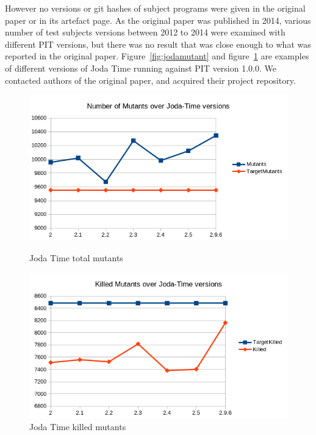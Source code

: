However no versions or git hashes of subject programs were given in the original paper or in its artefact page. As the original paper was published in 2014, various number of test subjects versions between 2012 to 2014 were examined with different PIT versions, but there was no result that was close enough to what was reported in the original paper. Figure~\ref{fig:jodamutant} and figure~\ref{fig:jodakilled} are examples of different versions of Joda Time running against PIT version 1.0.0. We contacted authors of the original paper, and acquired their project repository.


\begin{figure}
	\centering
	\begin{minipage}{0.4\textwidth}
		\centering
		\includegraphics[width=\textwidth]{Figure/joda_mutant.png}
		\caption{Joda Time total mutants}
		\label{fig:jodamutant}
	\end{minipage} %
	\begin{minipage}{0.4\textwidth}
		\centering
		\includegraphics[width=\textwidth]{Figure/joda_kill.png}
		\caption{Joda Time killed mutants}
		\label{fig:jodakilled}
	\end{minipage}
\end{figure}

